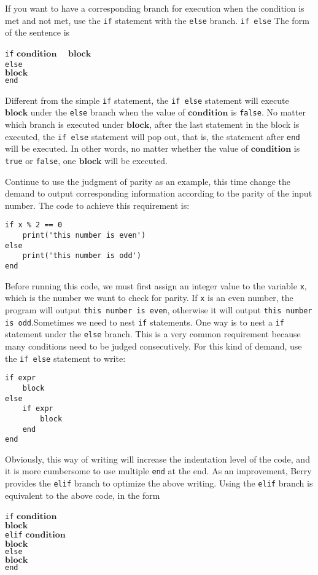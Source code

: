 If you want to have a corresponding branch for execution when the condition is met and not met, use the \texttt{if} statement with the \texttt{else} branch. \texttt{if else} The form of the sentence is
\begin{algorithm}
    \texttt{if} $\bm{condition}$ \ \
        \qquad $\bm{block}$ \\
    \texttt{else} \\
        \qquad $\bm{block}$ \\
    \texttt{end}
\end{algorithm}\vspace{-0.6em}
Different from the simple \texttt{if} statement, the \texttt{if else} statement will execute $\bm{block}$ under the \texttt{else} branch when the value of $\bm{condition}$ is \texttt{false}. No matter which branch is executed under $\bm{block}$, after the last statement in the block is executed, the \texttt{if else} statement will pop out, that is, the statement after \texttt{end} will be executed. In other words, no matter whether the value of $\bm{condition}$ is \texttt{true} or \texttt{false}, one $\bm{block}$ will be executed.

Continue to use the judgment of parity as an example, this time change the demand to output corresponding information according to the parity of the input number. The code to achieve this requirement is:
\begin{lstlisting}[language=berry, numbers=none]
if x % 2 == 0
    print('this number is even')
else
    print('this number is odd')
end
\end{lstlisting}
Before running this code, we must first assign an integer value to the variable \texttt{x}, which is the number we want to check for parity. If \texttt{x} is an even number, the program will output \texttt{this number is even}, otherwise it will output \texttt{this number is odd}.Sometimes we need to nest \texttt{if} statements. One way is to nest a \texttt{if} statement under the \texttt{else} branch. This is a very common requirement because many conditions need to be judged consecutively. For this kind of demand, use the \texttt{if else} statement to write:
\begin{lstlisting}[language=berry, numbers=none]
if expr
    block
else
    if expr
        block
    end
end
\end{lstlisting}
Obviously, this way of writing will increase the indentation level of the code, and it is more cumbersome to use multiple \texttt{end} at the end. As an improvement, Berry provides the \texttt{elif} branch to optimize the above writing. Using the \texttt{elif} branch is equivalent to the above code, in the form
\begin{algorithm}
    \texttt{if} $\bm{condition}$ \\
        \qquad $\bm{block}$ \\
    \texttt{elif} $\bm{condition}$ \\
        \qquad $\bm{block}$ \\
    \texttt{else} \\
    \qquad $\bm{block}$ \\
    \texttt{end}
\end{algorithm}\vspace{-0.6em}

